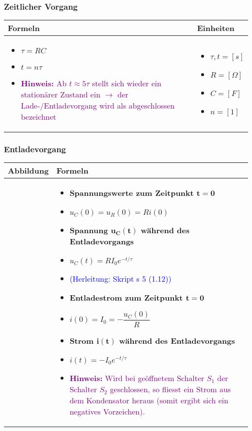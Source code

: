    	\subsubsection{Zeitlicher Vorgang}										
\begin{tabular}{ | m{15cm} | m{3cm}  | }
	\hline
	Formeln & Einheiten \\ \hline
	\hline
	\begin{itemize}
		\item[] $\tau = RC$
		\item[] $t=n\tau$
		\item[] \textcolor{purple}{\textbf{Hinweis:} Ab $t\approx5\tau$ stellt sich wieder ein stationärer Zustand ein $\rightarrow$ der Lade-/Entladevorgang wird als abgeschlossen bezeichnet}
	\end{itemize} 
	&   	
	\begin{itemize}
		\item[] $\tau,t = [s]$
		\item[] $R=[\Omega]$
		\item[] $C=[F]$
		\item[] $n=[1]$		
	\end{itemize} 
	\\ \hline
\end{tabular}

   	\subsubsection{Entladevorgang}										
\begin{tabular}{ | m{9cm} | m{9cm}  | }
	\hline
	Abbildung & Formeln \\ \hline
	\hline
	\begin{minipage}{.1\textwidth}
		\tabImg[width=9cm]{images/Entladevorgang.png}
	\end{minipage}
	&
	\begin{itemize}
		\item \textbf{Spannungswerte zum Zeitpunkt $\mathbf{t=0}$ }
		\item[] $u_C(0)=u_R(0)=Ri(0)$
		\item \textbf{Spannung $\mathbf{u_C(t)}$ während des Entladevorgangs}
		\item[] $u_C(t)=RI_0e^{-t/\tau}$ 
		\item[] \textcolor{blue}{(Herleitung: Skript s 5 (1.12))}
		\item \textbf{Entladestrom zum Zeitpunkt $\mathbf{t=0}$ }
		\item[] $i(0)=I_0=-\dfrac{u_C(0)}{R}$
		\item \textbf{Strom $\mathbf{i(t)}$ während des Entladevorgangs}
		\item[] $i(t)=-I_0e^{-t/\tau}$
		\item[] \textcolor{purple}{\textbf{Hinweis:} Wird bei geöffnetem Schalter $S_1$ der Schalter $S_2$ geschlossen, so fliesst ein Strom aus dem Kondensator heraus (somit ergibt sich ein negatives Vorzeichen).}
	\end{itemize}   	
	\\ \hline
\end{tabular}

